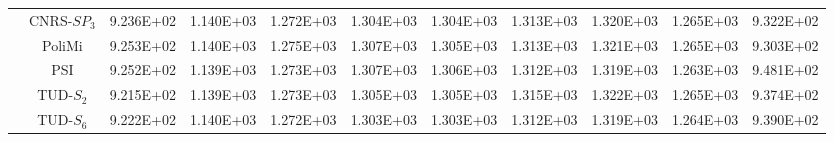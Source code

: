 \begin{table}[htbp!]
\begin{tabular}{c c c c c c c c c c c}
		& CNRS-$SP_3$ & 9.236E+02 & 1.140E+03 & 1.272E+03 & 1.304E+03 & 1.304E+03 & 1.313E+03 & 1.320E+03 & 1.265E+03 & 9.322E+02 \\
		& PoliMi & 9.253E+02 & 1.140E+03 & 1.275E+03 & 1.307E+03 & 1.305E+03 & 1.313E+03 & 1.321E+03 & 1.265E+03 & 9.303E+02 \\
		& PSI & 9.252E+02 & 1.139E+03 & 1.273E+03 & 1.307E+03 & 1.306E+03 & 1.312E+03 & 1.319E+03 & 1.263E+03 & 9.481E+02 \\
		& TUD-$S_2$ & 9.215E+02 & 1.139E+03 & 1.273E+03 & 1.305E+03 & 1.305E+03 & 1.315E+03 & 1.322E+03 & 1.265E+03 & 9.374E+02 \\
		& TUD-$S_6$ & 9.222E+02 & 1.140E+03 & 1.272E+03 & 1.303E+03 & 1.303E+03 & 1.312E+03 & 1.319E+03 & 1.264E+03 & 9.390E+02 \\
		\bottomrule
	\end{tabular}
\end{table}

